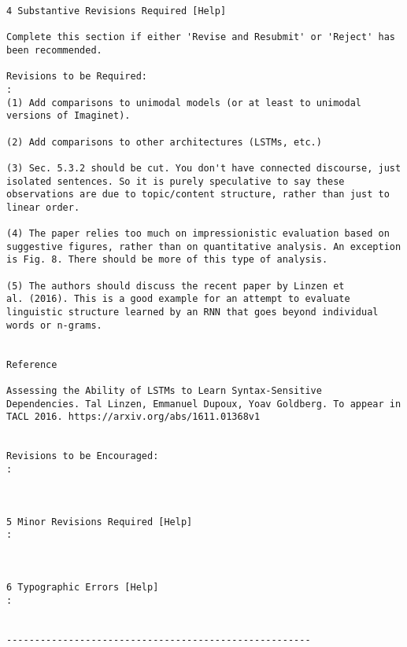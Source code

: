 \begin{verbatim}
4 Substantive Revisions Required [Help]

Complete this section if either 'Revise and Resubmit' or 'Reject' has
been recommended.

Revisions to be Required:
: 
(1) Add comparisons to unimodal models (or at least to unimodal
versions of Imaginet).

(2) Add comparisons to other architectures (LSTMs, etc.)

(3) Sec. 5.3.2 should be cut. You don't have connected discourse, just
isolated sentences. So it is purely speculative to say these
observations are due to topic/content structure, rather than just to
linear order.

(4) The paper relies too much on impressionistic evaluation based on
suggestive figures, rather than on quantitative analysis. An exception
is Fig. 8. There should be more of this type of analysis.

(5) The authors should discuss the recent paper by Linzen et
al. (2016). This is a good example for an attempt to evaluate
linguistic structure learned by an RNN that goes beyond individual
words or n-grams.


Reference

Assessing the Ability of LSTMs to Learn Syntax-Sensitive
Dependencies. Tal Linzen, Emmanuel Dupoux, Yoav Goldberg. To appear in
TACL 2016. https://arxiv.org/abs/1611.01368v1


Revisions to be Encouraged:
: 



5 Minor Revisions Required [Help]
: 



6 Typographic Errors [Help]
: 


------------------------------------------------------
\end{verbatim}

